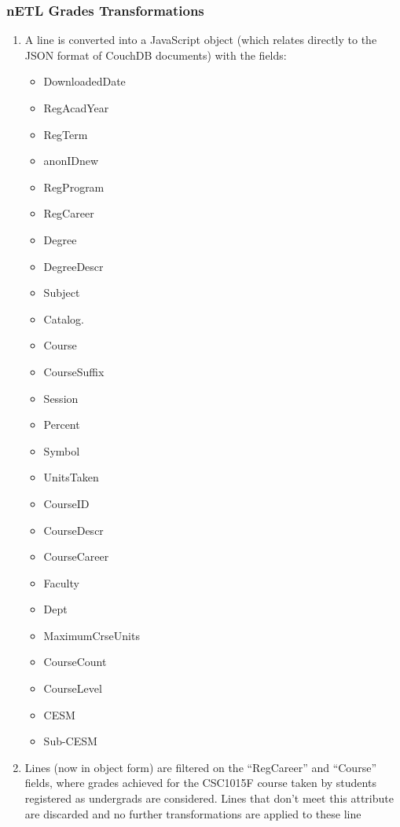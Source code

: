 \subsubsection{nETL Grades Transformations}
\begin{enumerate}
  \item A line is converted into a JavaScript object (which relates directly to the JSON format of CouchDB documents) with the fields:
        \begin{itemize}
          \item DownloadedDate
          \item RegAcadYear
          \item RegTerm
          \item anonIDnew
          \item RegProgram
          \item RegCareer
          \item Degree
          \item DegreeDescr
          \item Subject
          \item Catalog.
          \item Course
          \item CourseSuffix
          \item Session
          \item Percent
          \item Symbol
          \item UnitsTaken
          \item CourseID
          \item CourseDescr
          \item CourseCareer
          \item Faculty
          \item Dept
          \item MaximumCrseUnits
          \item CourseCount
          \item CourseLevel
          \item CESM
          \item Sub-CESM
        \end{itemize}
  \item Lines (now in object form) are filtered on the ``RegCareer'' and ``Course'' fields, where grades achieved for the CSC1015F course taken by students registered as undergrads are considered. Lines that don't meet this attribute are discarded and no further transformations are applied to these line

\end{enumerate}
